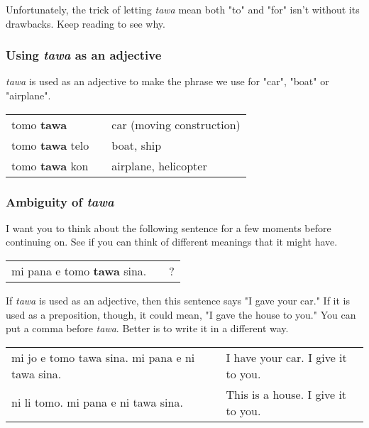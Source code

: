 Unfortunately, the trick of letting \textit{tawa} mean both "to" and "for" isn't without its drawbacks. 
Keep reading to see why. 

\subsubsection*{Using \textit{tawa} as an adjective}
%
\textit{tawa} is used as an adjective to make the phrase we use for "car", "boat" or "airplane".

\begin{supertabular}{p{5,5cm}|ll}
tomo \textbf{tawa} && car (moving construction) \\
tomo \textbf{tawa} telo && boat, ship \\
tomo \textbf{tawa} kon && airplane, helicopter \\
\end{supertabular} 
%
\subsubsection*{Ambiguity of \textit{tawa}}
%
I want you to think about the following sentence for a few moments before continuing on. 
See if you can think of different meanings that it might have. 

\begin{supertabular}{p{5,5cm}|ll}
mi pana e tomo \textbf{tawa} sina. && ? \\   %
\end{supertabular} 

If \textit{tawa} is used as an adjective, then this sentence says "I gave your car." 
If it is used as a preposition, though, it could mean, "I gave the house to you." 
You can put a comma before \textit{tawa}. 
Better is to write it in a different way.

\begin{supertabular}{p{5,5cm}|ll}
mi jo e tomo tawa sina. mi pana e ni tawa sina. && I have your car. I give it to you. \\
ni li tomo. mi pana e ni tawa sina. && This is a house. I give it to you. \\
\end{supertabular} 

